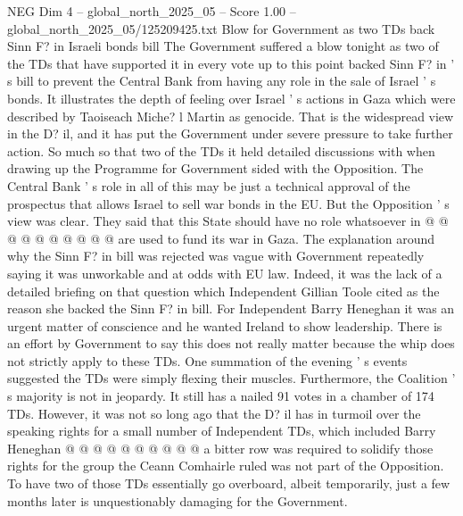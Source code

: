 \begin{textsample}{NEG Dim 4 – global\_north\_2025\_05 – Score 1.00 – global\_north\_2025\_05/125209425.txt}  \label{ex:f4_neg_269}
Blow for Government as two TDs back Sinn F? in Israeli bonds bill The Government suffered a blow tonight as two of the TDs that have supported it in every vote up to this point backed Sinn F? in ' s bill to prevent the Central Bank from having any role in the sale of Israel ' s bonds.
It illustrates the depth of feeling over Israel ' s actions in Gaza which were described by Taoiseach Miche? l Martin as genocide.
That is the widespread view in the D? il, and it has put the Government under severe pressure to take further action.
So much so that two of the TDs it held detailed discussions with when drawing up the Programme for Government sided with the Opposition.
The Central Bank ' s role in all of this may be just a technical approval of the prospectus that allows Israel to sell war bonds in the EU.
But the Opposition ' s view was clear.
They said that this State should have no role whatsoever in @ @ @ @ @ @ @ @ @ @ are used to fund its war in Gaza.
The explanation around why the Sinn F? in bill was rejected was vague with Government repeatedly saying it was unworkable and at odds with EU law.
Indeed, it was the lack of a detailed briefing on that question which Independent Gillian Toole cited as the reason she backed the Sinn F? in bill.
For Independent Barry Heneghan it was an urgent matter of conscience and he wanted Ireland to show leadership.
There is an effort by Government to say this does not really matter because the whip does not strictly apply to these TDs.
One summation of the evening ' s events suggested the TDs were simply flexing their muscles.
Furthermore, the Coalition ' s majority is not in jeopardy.
It still has a nailed 91 votes in a chamber of 174 TDs.
However, it was not so long ago that the D? il has in turmoil over the speaking rights for a small number of Independent TDs, which included Barry Heneghan @ @ @ @ @ @ @ @ @ @ a bitter row was required to solidify those rights for the group the Ceann Comhairle ruled was not part of the Opposition.
To have two of those TDs essentially go overboard, albeit temporarily, just a few months later is unquestionably damaging for the Government.

\end{textsample}
